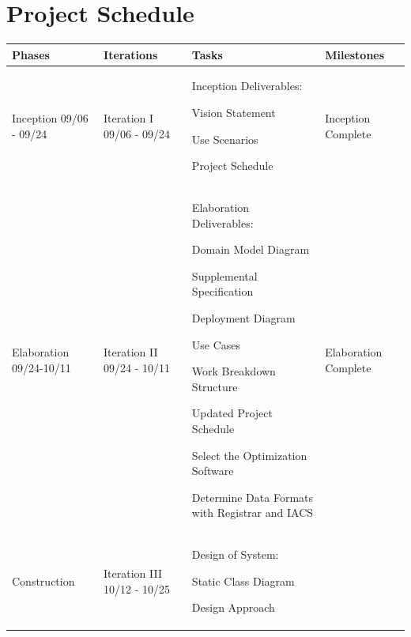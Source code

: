 \documentclass[11pt]{article}
\newenvironment{packed_itemize}{
\begin{itemize}
  \setlength{\itemsep}{1pt}
  \setlength{\parskip}{0pt}
  \setlength{\parsep}{0pt}
}{\end{itemize}}
\begin{document}
\section{Project Schedule}  %

\begin{tabular}{|m{0.9in}|m{0.9in}|m{4in}|m{.8in}|}
\hline
\textbf{Phases}  & \textbf{Iterations}  & \textbf{Tasks}        & \textbf{Milestones} \\
\hline\hline
Inception 09/06 - 09/24 &
Iteration I 09/06 - 09/24 & \vspace{0.1in}
Inception Deliverables:
	 \begin{packed_itemize}
	\vspace{-0.15in}
		\item Vision Statement
		\item Use Scenarios
		\item Project Schedule
	\vspace{-0.15in}
	\end{packed_itemize}
	& Inception Complete\\
\hline
Elaboration 09/24-10/11&
Iteration II 09/24 - 10/11&  \vspace{0.1in}
Elaboration Deliverables:
	 \begin{packed_itemize}
	\vspace{-0.15in}
		\item Domain Model Diagram
		\item Supplemental Specification
		\item Deployment Diagram
		\item Use Cases
		\item Work Breakdown Structure
		\item Updated Project Schedule
   \end{packed_itemize}


Select the Optimization Software

Determine Data Formats with Registrar and IACS
& Elaboration Complete
\\
\hline

\multirow{10}{*}{Construction }
 &
 Iteration III 10/12 - 10/25 & \vspace{0.1in}
 Design of System:
	\begin{packed_itemize}
		\vspace{-0.15in}
		\item Static Class Diagram
		\item Design Approach
	\end{packed_itemize}


\end{tabular}
\end{document}
